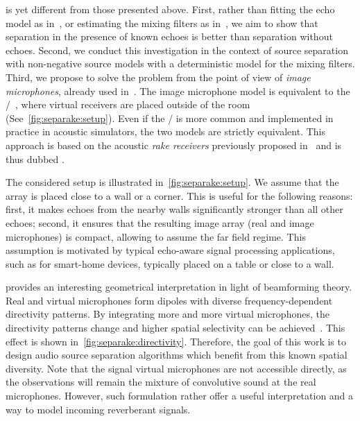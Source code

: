  is yet different from those presented above.
First, rather than fitting the echo model as in~, or estimating the mixing filters as in~,
we aim to show that separation in the presence of known echoes is better than separation without echoes.
Second, we conduct this investigation in the context of source separation with non-negative source models with a deterministic model for the mixing filters.
Third, we propose to solve the problem from the point of view of \textit{image microphones}, already used in~.
The image microphone model is equivalent to the \ISMdef/~, where virtual receivers are placed outside of the room (See~\cref{fig:separake:setup}).
Even if the \ISM/ is more common and implemented in practice in acoustic simulators, the two models are strictly equivalent.
This approach is based on the acoustic \textit{rake receivers} previously proposed in~ and is thus dubbed .


\mynewline
The considered setup is illustrated in~\cref{fig:separake:setup}.
We assume that the array is placed close to a wall or a corner.
This is useful for the following reasons:
first, it makes echoes from the nearby walls significantly stronger than all other echoes;
second, it ensures that the resulting image array (real and image microphones) is compact, allowing to assume the far field regime.
This assumption is motivated by typical echo-aware signal processing applications, such as for smart-home devices, typically placed on a table or close to a wall.

 provides an interesting geometrical interpretation in light of beamforming theory.
Real and virtual microphones form dipoles with diverse frequency-dependent directivity patterns.
By integrating more and more virtual microphones, the directivity patterns change and higher spatial selectivity can be achieved~.
This effect is shown in~\cref{fig:separake:directivity}.
Therefore, the goal of this work is to design audio source separation algorithms which benefit from this known spatial diversity.
Note that the signal virtual microphones are not accessible directly, as the observations will remain the mixture of convolutive sound at the real microphones.
However, such formulation rather offer a useful interpretation and a way to model incoming reverberant signals.

